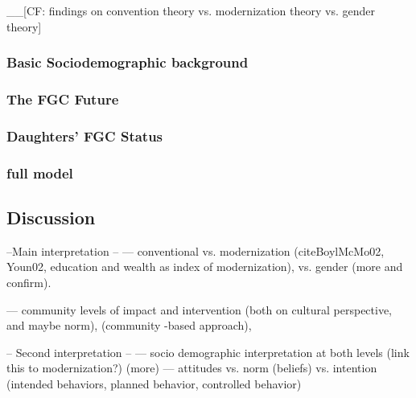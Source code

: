 \documentclass[12pt,]{article}
\begin{document}
\_\_{[}CF: findings on convention theory vs. modernization theory vs. gender theory{]}

\subsubsection{Basic Sociodemographic background}\label{Basic-Sociodemographic-background}

\subsubsection{The FGC Future}\label{The-FGC-Future}

\subsubsection{Daughters' FGC Status}\label{Daughters'-FGC-Status}

\subsubsection{full model}\label{full-model}



\subsection{Discussion}\label{Discussion}

--Main interpretation --
--- conventional \cite{FreyJohn07, Hayf05, Mack96, ShelWand11} vs. modernization (cite{BoylMcMo02, Youn02}, education and wealth as index of modernization), vs. gender \cite{Dell04, FrieMahm13, Lewi04, Meye00, Njam04, YirgKass12, Youn02} (more and confirm).  

--- community levels of impact and intervention
\cite{Drot11, Grue05, JoneEhir04} (both on cultural perspective, and maybe norm), 
\cite{ChegAske04}(community -based approach), \cite{BrowBeec13,PatrSing15}

-- Second interpretation --
--- socio demographic interpretation at both levels (link this to modernization?)
\cite{Hayf05, PashPonn16} (more)
--- attitudes vs. norm (beliefs) vs. intention (intended behaviors, planned behavior, controlled behavior) \cite{Ajze02, ThomMadd92}
\end{document}
